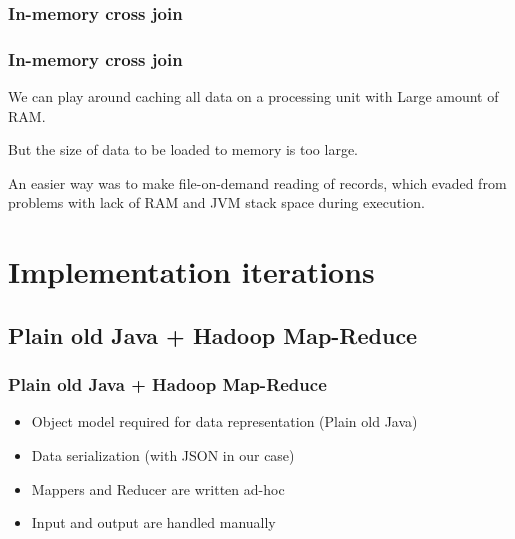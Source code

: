 \documentclass[handout]{beamer}
\begin{document}

\subsubsection{In-memory cross join}


\begin{frame}
\frametitle{\bf In-memory cross join}

We can play around caching all data on a processing unit with Large amount of RAM.

But the size of data to be loaded to memory is too large.

An easier way was to make file-on-demand reading of records, which evaded from problems with lack of RAM and JVM stack space during execution.

\end{frame}


\section{Implementation iterations}

\subsection{Plain old Java + Hadoop Map-Reduce}


\begin{frame}
\frametitle{\bf Plain old Java + Hadoop Map-Reduce}

\begin{itemize}
\item Object model required for data representation (Plain old Java)
\item Data serialization (with JSON in our case)
\item Mappers and Reducer are written ad-hoc
\item Input and output are handled manually
\end{itemize}

\end{frame}

\end{document}
